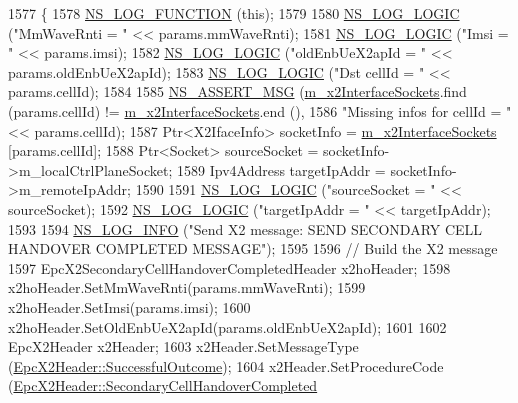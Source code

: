\begin{DoxyCode}
1577 \{
1578   \hyperlink{log-macros-disabled_8h_a90b90d5bad1f39cb1b64923ea94c0761}{NS\_LOG\_FUNCTION} (\textcolor{keyword}{this});
1579 
1580   \hyperlink{group__logging_ga88acd260151caf2db9c0fc84997f45ce}{NS\_LOG\_LOGIC} (\textcolor{stringliteral}{"MmWaveRnti = "} << params.mmWaveRnti);
1581   \hyperlink{group__logging_ga88acd260151caf2db9c0fc84997f45ce}{NS\_LOG\_LOGIC} (\textcolor{stringliteral}{"Imsi = "} << params.imsi);
1582   \hyperlink{group__logging_ga88acd260151caf2db9c0fc84997f45ce}{NS\_LOG\_LOGIC} (\textcolor{stringliteral}{"oldEnbUeX2apId = "} << params.oldEnbUeX2apId);
1583   \hyperlink{group__logging_ga88acd260151caf2db9c0fc84997f45ce}{NS\_LOG\_LOGIC} (\textcolor{stringliteral}{"Dst cellId = "} << params.cellId);
1584 
1585   \hyperlink{assert_8h_aff5ece9066c74e681e74999856f08539}{NS\_ASSERT\_MSG} (\hyperlink{classns3_1_1EpcX2_a0665276228b9b99a52ef6d5e9bdb306d}{m\_x2InterfaceSockets}.find (params.cellId) != 
      \hyperlink{classns3_1_1EpcX2_a0665276228b9b99a52ef6d5e9bdb306d}{m\_x2InterfaceSockets}.end (),
1586                  \textcolor{stringliteral}{"Missing infos for cellId = "} << params.cellId);
1587   Ptr<X2IfaceInfo> socketInfo = \hyperlink{classns3_1_1EpcX2_a0665276228b9b99a52ef6d5e9bdb306d}{m\_x2InterfaceSockets} [params.cellId];
1588   Ptr<Socket> sourceSocket = socketInfo->m\_localCtrlPlaneSocket;
1589   Ipv4Address targetIpAddr = socketInfo->m\_remoteIpAddr;
1590 
1591   \hyperlink{group__logging_ga88acd260151caf2db9c0fc84997f45ce}{NS\_LOG\_LOGIC} (\textcolor{stringliteral}{"sourceSocket = "} << sourceSocket);
1592   \hyperlink{group__logging_ga88acd260151caf2db9c0fc84997f45ce}{NS\_LOG\_LOGIC} (\textcolor{stringliteral}{"targetIpAddr = "} << targetIpAddr);
1593 
1594   \hyperlink{group__logging_gafbd73ee2cf9f26b319f49086d8e860fb}{NS\_LOG\_INFO} (\textcolor{stringliteral}{"Send X2 message: SEND SECONDARY CELL HANDOVER COMPLETED MESSAGE"});
1595 
1596   \textcolor{comment}{// Build the X2 message}
1597   EpcX2SecondaryCellHandoverCompletedHeader x2hoHeader;
1598   x2hoHeader.SetMmWaveRnti(params.mmWaveRnti);
1599   x2hoHeader.SetImsi(params.imsi);
1600   x2hoHeader.SetOldEnbUeX2apId(params.oldEnbUeX2apId);
1601 
1602   EpcX2Header x2Header;
1603   x2Header.SetMessageType (\hyperlink{classns3_1_1EpcX2Header_a0e69b043a20eaee4c570f223f4eca715a21bd7a420a07fd4849d7271a5c381a44}{EpcX2Header::SuccessfulOutcome});
1604   x2Header.SetProcedureCode (\hyperlink{classns3_1_1EpcX2Header_afd178c1ed3c47948c587955698a15b0da3b5622b54cfa751687a29cea3845339b}{EpcX2Header::SecondaryCellHandoverCompleted}

\end{DoxyCode}
